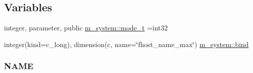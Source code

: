 \subsection*{Variables}
\begin{DoxyCompactItemize}
\item 
integer, parameter, public \mbox{\hyperlink{namespacem__system_abdb5cc27c945379d844db4830d499050}{m\+\_\+system\+::mode\+\_\+t}} =int32
\item 
integer(kind=c\+\_\+long), dimension(c, name=\char`\"{}fhost\+\_\+name\+\_\+max\char`\"{}) \mbox{\hyperlink{namespacem__system_a7d597052e9d23e2d899e6f81a4509c70}{m\+\_\+system\+::bind}}
\begin{DoxyCompactList}\small\item\em \subsubsection*{N\+A\+ME}


\end{DoxyCompactList}
\end{DoxyCompactItemize}
